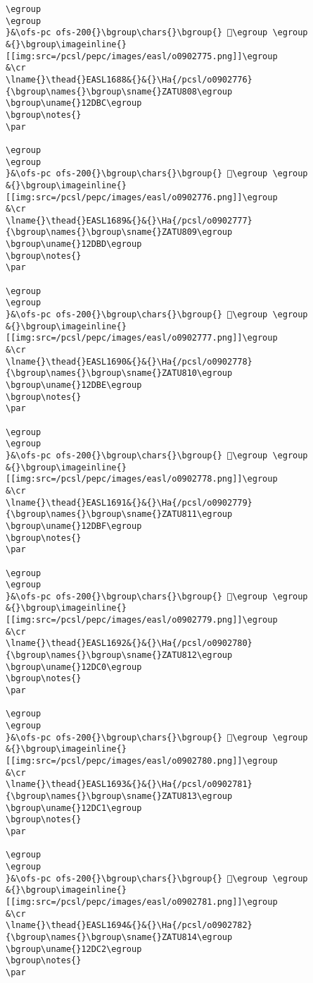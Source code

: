\begin{verbatim}
\egroup
\egroup
}&\ofs-pc ofs-200{}\bgroup\chars{}\bgroup{} 𒶻\egroup \egroup
&{}\bgroup\imageinline{}[[img:src=/pcsl/pepc/images/easl/o0902775.png]]\egroup
&\cr
\lname{}\thead{}EASL1688&{}&{}\Ha{/pcsl/o0902776}{\bgroup\names{}\bgroup\sname{}ZATU808\egroup
\bgroup\uname{}12DBC\egroup
\bgroup\notes{}
\par 

\egroup
\egroup
}&\ofs-pc ofs-200{}\bgroup\chars{}\bgroup{} 𒶼\egroup \egroup
&{}\bgroup\imageinline{}[[img:src=/pcsl/pepc/images/easl/o0902776.png]]\egroup
&\cr
\lname{}\thead{}EASL1689&{}&{}\Ha{/pcsl/o0902777}{\bgroup\names{}\bgroup\sname{}ZATU809\egroup
\bgroup\uname{}12DBD\egroup
\bgroup\notes{}
\par 

\egroup
\egroup
}&\ofs-pc ofs-200{}\bgroup\chars{}\bgroup{} 𒶽\egroup \egroup
&{}\bgroup\imageinline{}[[img:src=/pcsl/pepc/images/easl/o0902777.png]]\egroup
&\cr
\lname{}\thead{}EASL1690&{}&{}\Ha{/pcsl/o0902778}{\bgroup\names{}\bgroup\sname{}ZATU810\egroup
\bgroup\uname{}12DBE\egroup
\bgroup\notes{}
\par 

\egroup
\egroup
}&\ofs-pc ofs-200{}\bgroup\chars{}\bgroup{} 𒶾\egroup \egroup
&{}\bgroup\imageinline{}[[img:src=/pcsl/pepc/images/easl/o0902778.png]]\egroup
&\cr
\lname{}\thead{}EASL1691&{}&{}\Ha{/pcsl/o0902779}{\bgroup\names{}\bgroup\sname{}ZATU811\egroup
\bgroup\uname{}12DBF\egroup
\bgroup\notes{}
\par 

\egroup
\egroup
}&\ofs-pc ofs-200{}\bgroup\chars{}\bgroup{} 𒶿\egroup \egroup
&{}\bgroup\imageinline{}[[img:src=/pcsl/pepc/images/easl/o0902779.png]]\egroup
&\cr
\lname{}\thead{}EASL1692&{}&{}\Ha{/pcsl/o0902780}{\bgroup\names{}\bgroup\sname{}ZATU812\egroup
\bgroup\uname{}12DC0\egroup
\bgroup\notes{}
\par 

\egroup
\egroup
}&\ofs-pc ofs-200{}\bgroup\chars{}\bgroup{} 𒷀\egroup \egroup
&{}\bgroup\imageinline{}[[img:src=/pcsl/pepc/images/easl/o0902780.png]]\egroup
&\cr
\lname{}\thead{}EASL1693&{}&{}\Ha{/pcsl/o0902781}{\bgroup\names{}\bgroup\sname{}ZATU813\egroup
\bgroup\uname{}12DC1\egroup
\bgroup\notes{}
\par 

\egroup
\egroup
}&\ofs-pc ofs-200{}\bgroup\chars{}\bgroup{} 𒷁\egroup \egroup
&{}\bgroup\imageinline{}[[img:src=/pcsl/pepc/images/easl/o0902781.png]]\egroup
&\cr
\lname{}\thead{}EASL1694&{}&{}\Ha{/pcsl/o0902782}{\bgroup\names{}\bgroup\sname{}ZATU814\egroup
\bgroup\uname{}12DC2\egroup
\bgroup\notes{}
\par 


\end{verbatim}
